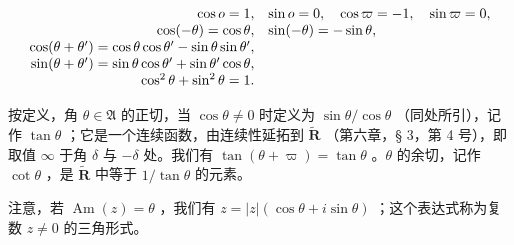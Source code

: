 \[
\begin{array}{r l} \cos o = 1, & \sin o = 0, \quad \cos \varpi = - 1, \quad \sin \varpi = 0, \\ \cos (- \theta) = \cos \theta , & \sin (- \theta) = - \sin \theta , \\ \cos (\theta + \theta^ {\prime}) = \cos \theta \cos \theta^ {\prime} - \sin \theta \sin \theta^ {\prime}, \\ \sin (\theta + \theta^ {\prime}) = \sin \theta \cos \theta^ {\prime} + \sin \theta^ {\prime} \cos \theta , \\ \cos^ {2} \theta + \sin^ {2} \theta = 1. \end{array}
\]

按定义，角 \(\theta \in \mathfrak{A}\) 的正切，当 \(\cos \theta \neq 0\) 时定义为 \(\sin \theta / \cos \theta\) （同处所引），记作 \(\tan \theta\) ；它是一个连续函数，由连续性延拓到 \(\tilde{\mathbf{R}}\) （第六章，§ 3，第 4 号），即取值 \(\infty\) 于角 \(\delta\) 与 \(-\delta\) 处。我们有 \(\tan (\theta + \varpi) = \tan \theta\) 。\(\theta\) 的余切，记作 \(\cot \theta\) ，是 \(\tilde{\mathbf{R}}\) 中等于 \(1 / \tan \theta\) 的元素。

注意，若 \(\operatorname{Am}(z) = \theta\) ，我们有 \(z = |z| (\cos \theta + i \sin \theta)\) ；这个表达式称为复数 \(z \neq 0\) 的三角形式。

